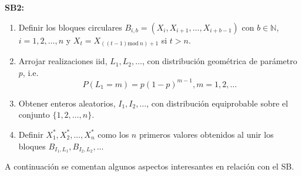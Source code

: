 \documentclass[]{book}
\theoremstyle{definition}
\theoremstyle{definition}
\theoremstyle{definition}
\theoremstyle{remark}
\begin{document}
\textbf{SB2:}

\begin{enumerate}
\def\labelenumi{\arabic{enumi}.}
\item
  Definir los bloques circulares
  \(B_{i,b}=(X_i,X_{i+1},\ldots ,X_{i+b-1})\) con \(b\in \mathbb{N}\),
  \(i=1,2,\ldots ,n\) y
  \(X_{t}=X_{\left(\left( t-1 \right) \mathrm{mod\ }n \right) +1}\) si
  \(t>n\).
\item
  Arrojar realizaciones iid, \(L_1,L_2,\ldots\), con distribución
  geométrica de parámetro \(p\), i.e.
  \[P(L_1=m)=p(1-p)^{m-1},m=1,2,\ldots\]
\item
  Obtener enteros aleatorios, \(I_1,I_2,\ldots\), con distribución
  equiprobable sobre el conjunto \(\{1,2,\ldots ,n\}\).
\item
  Definir \(X_1^{\ast},X_2^{\ast},\ldots ,X_n^{\ast}\) como los \(n\)
  primeros valores obtenidos al unir los bloques
  \(B_{I_1,L_1},B_{I_2,L_2},\ldots\)
\end{enumerate}

A continuación se comentan algunos aspectos interesantes en relación con
el SB.
\end{document}
